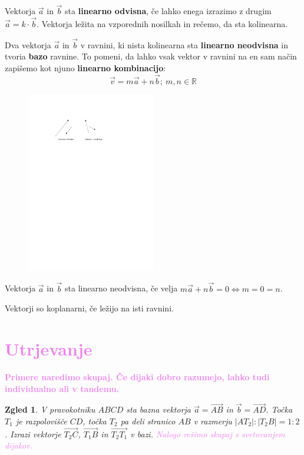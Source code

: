 \documentclass{article}
\newtheorem*{zgled}{Zgled}
\begin{document}
Vektorja $\vec{a}$ in $\vec{b}$ sta \textbf{linearno odvisna}, če lahko enega izrazimo z drugim $\vec{a}=k\cdot \vec{b}$. Vektorja ležita na vzporednih nosilkah in rečemo, da sta kolinearna.

Dva vektorja $\vec{a}$ in $\vec{b}$ v ravnini, ki nista kolinearna sta \textbf{linearno neodvisna} in tvoria \textbf{bazo} ravnine. To pomeni, da lahko vsak vektor v ravnini na en sam način zapišemo kot njuno \textbf{linearno kombinacijo}:
\[\vec{v}=m\vec{a}+n\vec{b};\ m,n\in\mathbb{R}\]

\begin{figure}[H]
    \includegraphics[width=0.5\textwidth]{odvisnost.pdf}
    \centering
\end{figure}

Vektorja $\vec{a}$ in $\vec{b}$ sta linearno neodvisna, če velja $m\vec{a}+n\vec{b}=0 \iff m=0=n$.

Vektorji so koplanarni, če ležijo na isti ravnini.

\section*{\textcolor{violet}{Utrjevanje}}
\textbf{\textcolor{violet}{Primere naredimo skupaj. Če dijaki dobro razumejo, lahko tudi individualno ali v tandemu.}}

\begin{zgled}
    V pravokotniku $ABCD$ sta bazna vektorja $\vec{a}=\vec{AB}$ in $\vec{b}=\vec{AD}$. Točka $T_1$ je razpolovišče $CD$, točka $T_2$ pa deli stranico $AB$ v razmerju $|AT_2|:|T_2 B|=1:2$. Izrazi vektorje $\vec{T_2 C}$, $\vec{T_1 B}$ in $\vec{T_2 T_1}$ v bazi. \textcolor{violet}{Nalogo rešimo skupaj s svetovanjem dijakov.}
\end{zgled}
\end{document}
